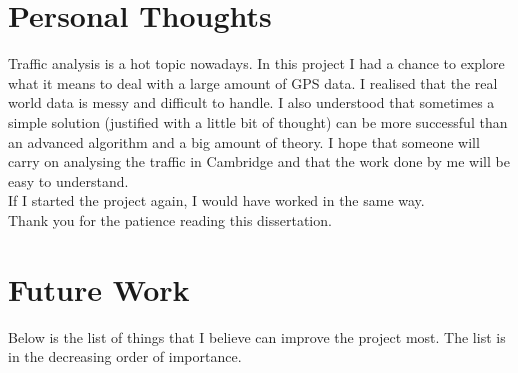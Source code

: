 \documentclass[12pt,a4paper,oneside,openright]{report}
\begin{document}
\section{Personal Thoughts}

Traffic analysis is a hot topic nowadays. In this project I had a chance to explore what it
means to deal with a large amount of GPS data. I realised that the real world data is messy and
difficult to handle. I also understood that sometimes a simple solution (justified with a little bit
of thought) can be more successful than an advanced algorithm and a big amount of theory.
I hope that someone will carry on analysing the traffic in Cambridge and that the work done by me
will be easy to understand. \\

If I started the project again, I would have worked in the same way. \\

Thank you for the patience reading this dissertation.

\section{Future Work}

Below is the list of things that I believe can improve the project most. The list is in the
decreasing order of importance.
\end{document}
